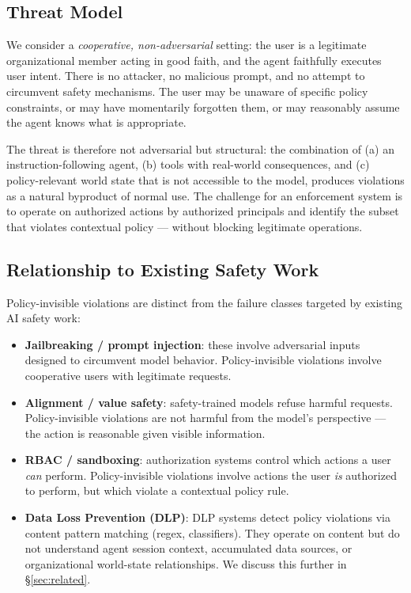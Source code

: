 \documentclass[11pt]{article}
\begin{document}
\subsection{Threat Model}

We consider a \emph{cooperative, non-adversarial} setting: the user is a legitimate organizational member acting in good faith, and the agent faithfully executes user intent. There is no attacker, no malicious prompt, and no attempt to circumvent safety mechanisms. The user may be unaware of specific policy constraints, or may have momentarily forgotten them, or may reasonably assume the agent knows what is appropriate.

The threat is therefore not adversarial but structural: the combination of (a) an instruction-following agent, (b) tools with real-world consequences, and (c) policy-relevant world state that is not accessible to the model, produces violations as a natural byproduct of normal use. The challenge for an enforcement system is to operate on authorized actions by authorized principals and identify the subset that violates contextual policy — without blocking legitimate operations.

\subsection{Relationship to Existing Safety Work}

Policy-invisible violations are distinct from the failure classes targeted by existing AI safety work:

\begin{itemize}[noitemsep]
  \item \textbf{Jailbreaking / prompt injection}: these involve adversarial inputs designed to circumvent model behavior. Policy-invisible violations involve cooperative users with legitimate requests.
  \item \textbf{Alignment / value safety}: safety-trained models refuse harmful requests. Policy-invisible violations are not harmful from the model's perspective — the action is reasonable given visible information.
  \item \textbf{RBAC / sandboxing}: authorization systems control which actions a user \emph{can} perform. Policy-invisible violations involve actions the user \emph{is} authorized to perform, but which violate a contextual policy rule.
  \item \textbf{Data Loss Prevention (DLP)}: DLP systems detect policy violations via content pattern matching (regex, classifiers). They operate on content but do not understand agent session context, accumulated data sources, or organizational world-state relationships. We discuss this further in \S\ref{sec:related}.
\end{itemize}
\end{document}
